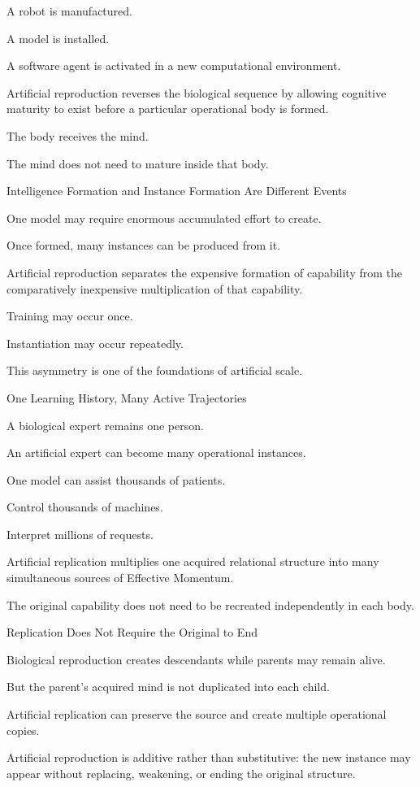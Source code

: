 A robot is manufactured.

A model is installed.

A software agent is activated in a new computational environment.

Artificial reproduction reverses the biological sequence by allowing cognitive maturity to exist before a particular operational body is formed.

The body receives the mind.

The mind does not need to mature inside that body.

Intelligence Formation and Instance Formation Are Different Events

One model may require enormous accumulated effort to create.

Once formed, many instances can be produced from it.

Artificial reproduction separates the expensive formation of capability from the comparatively inexpensive multiplication of that capability.

Training may occur once.

Instantiation may occur repeatedly.

This asymmetry is one of the foundations of artificial scale.

One Learning History, Many Active Trajectories

A biological expert remains one person.

An artificial expert can become many operational instances.

One model can assist thousands of patients.

Control thousands of machines.

Interpret millions of requests.

Artificial replication multiplies one acquired relational structure into many simultaneous sources of Effective Momentum.

The original capability does not need to be recreated independently in each body.

Replication Does Not Require the Original to End

Biological reproduction creates descendants while parents may remain alive.

But the parent’s acquired mind is not duplicated into each child.

Artificial replication can preserve the source and create multiple operational copies.

Artificial reproduction is additive rather than substitutive: the new instance may appear without replacing, weakening, or ending the original structure.

